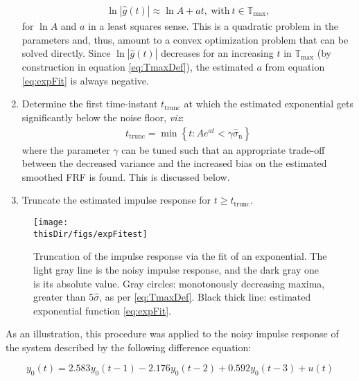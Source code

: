 \begin{enumerate}
\begin{align}\label{eq:expFit}
\ln \left|\hat g(t)\right|\approx \ln A+at,\ \mathrm{with}\ t\in\mathbb{T}_\mathrm{max},
\end{align}
for $\ln A$ and $a$ in a least squares sense.
This is a quadratic problem in the parameters and, thus, amount to a convex optimization problem that can be solved directly.
Since  $\ln \left|\hat g(t)\right|$ decreases for an increasing $t$ in $\mathbb{T}_\mathrm{max}$ (by construction in equation \eqref{eq:TmaxDef}), the estimated $a$ from equation \eqref{eq:expFit} is always negative.

\item
Determine the first time-instant $t_\mathrm{trunc}$ at which the estimated exponential gets significantly below the noise floor, \emph{viz}:
\begin{align}\label{eq:truncTimeExpFit}
t_\mathrm{trunc} = \min \left\{t:Ae^{at} < \gamma\hat\sigma_\mathrm{n}\right\}
\end{align}
where the parameter $\gamma$ can be tuned such that an appropriate trade-off between the decreased variance and the increased bias on the estimated smoothed FRF is found. This is discussed below. %

\item
 Truncate the estimated impulse response for $t \geqslant t_\mathrm{trunc}$.

\end{enumerate}

\begin{figure}[tbh] %
\centering

\texttt{[image: \\thisDir/figs/expFitest]}
\caption{Truncation of the impulse response via the fit of  an exponential. The light gray line is the noisy impulse response, and the dark gray one is its absolute value. Gray circles: monotonously decreasing maxima, greater than $5\hat\sigma$, as per \eqref{eq:TmaxDef}. Black thick line: estimated exponential function \eqref{eq:expFit}.}
\label{FRF_truncate_expfitter}
\end{figure}

As an illustration, this procedure was applied to the noisy impulse response of the system described by the following difference equation:

\begin{equation}
y_0(t) = 2.583y_0(t - 1) -2.176y_0(t - 2)+0.592y_0(t-3) + u(t)
\end{equation}

